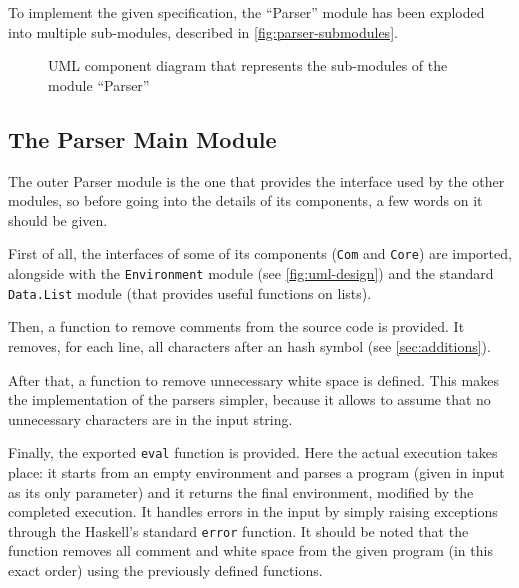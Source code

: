 \documentclass{esposito-documentation}
\begin{document}
To implement the given specification, the ``Parser'' module has been exploded
into multiple sub-modules, described in
\autoref{fig:parser-submodules}.

\begin{figure}[H]
	\centering
	\caption{UML component diagram that represents the sub-modules of the module ``Parser''}
	\label{fig:parser-submodules}
\end{figure}

\subsection{The Parser Main Module}


The outer Parser module is the one that provides the interface used by the
other modules, so before going into the details of its components, a few words
on it should be given.

First of all, the interfaces of some of its components (\texttt{Com} and
\texttt{Core}) are imported, alongside with the \texttt{Environment} module
(see \autoref{fig:uml-design}) and the standard \texttt{Data.List} module (that
provides useful functions on lists).



Then, a function to remove comments from the source code is provided. It removes, for each line, all characters after an hash symbol (see \autoref{sec:additions}).



After that, a function to remove unnecessary white space is defined. This makes
the implementation of the parsers simpler, because it allows to assume that no
unnecessary characters are in the input string.



Finally, the exported \lstinline|eval| function is provided. Here the actual
execution takes place: it starts from an empty environment and parses a program
(given in input as its only parameter) and it returns the final environment,
modified by the completed execution. It handles errors in the input by simply
raising exceptions through the Haskell's standard \lstinline|error| function.
It should be noted that the function removes all comment and white space from
the given program (in this exact order) using the previously defined functions.
\end{document}
